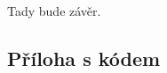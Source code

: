 \documentclass[12pt]{report}			%
\begin{document}
		Tady bude závěr.
	
	\nocite{*}
    \printbibliography					%
    \printglossary[title={Zkratky}]		%
    \listoffigures						%
    \listoftables						%

    \begin{appendices}
	\chapter{Příloha s kódem}	

	\end{appendices}
\end{document}
